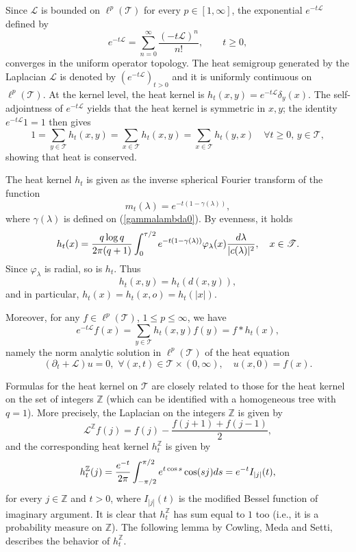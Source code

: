 \documentclass[10pt,a4paper]{amsart}
\renewcommand\mathcal{\mathscr}
\def\int{\intop\nolimits}
\theoremstyle{plain}
\theoremstyle{remark}
\theoremstyle{definition}
\begin{document}
Since $\mathcal L$ is bounded on $\ell^p(\mathcal T)$ for every
$p\in[1,\infty]$, the exponential $e^{-t\mathcal L}$ defined by
\[
e^{-t\mathcal L}
=
\sum_{n=0}^\infty\frac{(-t\mathcal L)^n}{n!},
\qquad t\geq0,
\]
converges in the uniform operator topology.
The heat semigroup generated by the Laplacian $\mathcal{L}$ is denoted by $(e^{-t\mathcal{L}})_{t> 0}$ and it is uniformly
continuous on $\ell^p(\mathcal{T})$. At the kernel level, the heat kernel is $h_t(x,y)=e^{-t\mathcal{L}}\delta_y(x)$. 
The self-adjointness of $e^{-t\mathcal{L}}$ yields that the heat kernel is symmetric in $x,y$; the identity $e^{-t\mathcal{L}}1=1$ then gives
\[
1=\sum_{y\in \mathcal{T}}h_t(x,y)=\sum_{x\in \mathcal{T}}h_t(x,y)= \sum_{x\in \mathcal{T}}h_t(y,x) \quad \forall t\geq 0, \, y\in \mathcal{T},
\]
showing that heat is conserved.

	The heat kernel $h_t$ is given as the inverse spherical Fourier transform of the function 
	\begin{equation*}
	m_t(\lambda)=e^{-t(1-\gamma(\lambda))},
	\end{equation*} where $\gamma(\lambda)$ is defined on (\ref{gammalambda0}). By evenness, it holds 
	\begin{equation}\label{inversionT} 
		h_t(x)=\frac{q\log q}{2\pi(q+1)}\int_{0}^{\tau /2}e^{-t(1-\gamma(\lambda))}\varphi_{\lambda}(x)\frac{d \lambda}{|\textbf{c}(\lambda)|^2}, \quad  x\in \mathcal{T}.
	\end{equation}
Since $\varphi_{\lambda}$ is radial, so is $h_t$. Thus
\[
h_t(x,y)=h_t(d(x,y)),
\]
and in particular, $h_t(x)=h_t(x,o)=h_t(|x|)$.

Moreover, for any $f\in \ell^p(\mathcal{T})$, $1\leq p \leq \infty$, we have
$$e^{-t\mathcal{L}}f(x)=\sum_{y\in \mathcal{T}}h_t(x,y)f(y)=f\ast h_t(x),$$
namely the norm analytic solution in $\ell^p(\mathcal{T})$ of the heat equation $$(\partial_t+\mathcal{L})u=0, \,\, \forall (x,t)\in \mathcal{T}\times (0, \infty), \quad u(x,0)=f(x).$$
	
	Formulas for the heat kernel on $\mathcal{T}$ are closely related to those for the heat kernel on the set of integers $\mathbb{Z}$ (which can be identified with a homogeneous tree with $q=1$). More precisely, the Laplacian on the integers $\mathbb{Z}$ is given by 
	\[
	\mathcal{L}^{\mathbb{Z}}f(j)=f(j)-\frac{f(j+1)+f(j-1)}{2}, 
	\]
	and the corresponding heat kernel $h_t^{\mathbb{Z}}$ is given by
	\begin{align*}
		h_t^{\mathbb{Z}}(j)=\frac{e^{-t}}{2\pi}\int_{-\pi /2}^{\pi/2}e^{t\cos s}\cos (sj)ds=e^{-t}I_{|j|}(t), 
	\end{align*}
	for every $j\in \mathbb{Z}$ and $t>0$, where $I_{|j|}(t)$ is the modified Bessel function of imaginary
argument. It is clear that $h_t^{\mathbb{Z}}$ has sum equal to $1$ too (i.e., it is a probability measure on $\mathbb{Z}$). The following lemma by Cowling, Meda and Setti, describes the behavior of $h_t^{\mathbb{Z}}$.
	
\end{document}
